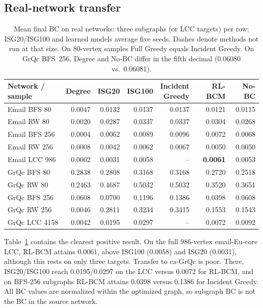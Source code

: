 \documentclass[runningheads]{llncs}
\newcommand{\rlbcm}{RL-BCM}
\begin{document}
\subsection{Real-network transfer}
\begin{table}[t]
\centering
\caption{Mean final BC on real networks: three subgraphs (or LCC targets)
per row; ISG20/ISG100 and learned models average five seeds. Dashes denote
methods not run at that size. On 80-vertex samples Full Greedy equals
Incident Greedy. On GrQc BFS~256, Degree and No-BC differ in
the fifth decimal (0.06080 vs.\ 0.06081).}
\label{tab:real}
\small
\setlength{\tabcolsep}{4pt}
\begin{tabular}{lrrrrrr}
\toprule
Network / sample & Degree & ISG20 & ISG100 & \shortstack{Incident\\Greedy} & \rlbcm & No-BC \\
\midrule
Email BFS 80   & 0.0047 & 0.0132 & 0.0137 & 0.0137 & 0.0121 & 0.0115 \\
Email RW 80    & 0.0020 & 0.0287 & 0.0337 & 0.0337 & 0.0304 & 0.0268 \\
Email BFS 256  & 0.0004 & 0.0062 & 0.0089 & 0.0096 & 0.0072 & 0.0068 \\
Email RW 256   & 0.0008 & 0.0042 & 0.0062 & 0.0067 & 0.0050 & 0.0050 \\
Email LCC 986  & 0.0002 & 0.0031 & 0.0058 & --     & \textbf{0.0061} & 0.0053 \\
\midrule
GrQc BFS 80    & 0.2838 & 0.2808 & 0.3168 & 0.3168 & 0.2720 & 0.2518 \\
GrQc RW 80     & 0.2463 & 0.4687 & 0.5032 & 0.5032 & 0.3520 & 0.3651 \\
GrQc BFS 256   & 0.0608 & 0.0700 & 0.1196 & 0.1386 & 0.0398 & 0.0608 \\
GrQc RW 256    & 0.0046 & 0.2811 & 0.3234 & 0.3415 & 0.1553 & 0.1543 \\
GrQc LCC 4158  & 0.0042 & 0.0195 & 0.0297 & --     & 0.0072 & 0.0092 \\
\bottomrule
\end{tabular}
\end{table}

Table~\ref{tab:real} contains the clearest positive result. On the full
986-vertex email-Eu-core LCC, \rlbcm{} attains 0.0061, above ISG100
(0.0058) and ISG20 (0.0031), although this rests on only three targets.
Transfer to ca-GrQc is poor. There, ISG20/ISG100 reach 0.0195/0.0297 on the LCC
versus 0.0072 for \rlbcm, and on BFS-256 subgraphs \rlbcm{} attains 0.0398
versus 0.1386 for Incident Greedy. All BC values are normalized within the
optimized graph, so subgraph BC is not the BC in the source network.
\end{document}
